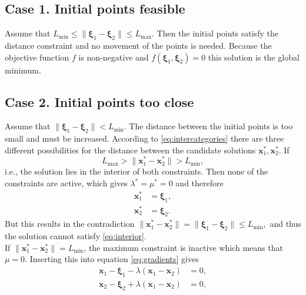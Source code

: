 \subsection{Case 1. Initial points feasible}
%
Assume that $ L_{\min} \leq \| \boldsymbol{\xi}_1 - \boldsymbol{\xi}_2 \| \leq L_{\max} $.
Then the initial points satisfy the distance constraint and no movement of the points is needed. 
Because the objective function $f$ is non-negative
and $f(\boldsymbol{\xi}_1,\boldsymbol{\xi}_2) = 0$ this solution is the global minimum.
%
%
\subsection{Case 2. Initial points too close}
%
Assume that $ \| \boldsymbol{\xi}_1 - \boldsymbol{\xi}_2 \| < L_{\min} $.
The distance between the initial points is too small and must be increased.
%
According to \eqref{eq:intercategories} there are three different possibilities 
for the distance between the candidate solutions $\textbf{x}_1^*, \textbf{x}_2^*$. 
%
If 
\begin{equation}
L_{\max} >  \| \textbf{x}_1^* - \textbf{x}_2^*  \| > L_{\min},
\label{eq:interior}
\end{equation}
i.e., the solution lies in the interior of both constraints. 
Then none of the constraints are active, which gives
$\lambda^* =\mu^* = 0 $ and therefore
%
\begin{equation}
\begin{aligned}
    	\textbf{x}_1^* &= \boldsymbol{\xi}_1,\\
    	\textbf{x}_2^* &= \boldsymbol{\xi}_2.
\end{aligned}
\end{equation}
%
But this results in the contradiction 
$\| \textbf{x}_1^* - \textbf{x}_2^*  \| = \| \boldsymbol{\xi}_1 - \boldsymbol{\xi}_2 \| \leq L_{\min},$ 
and thus the solution cannot satisfy \eqref{eq:interior}.\\
%
%
If $\| \textbf{x}_1^* - \textbf{x}_2^*  \| = L_{\min}$, the maximum
constraint is inactive which means that $\mu = 0$. Inserting this into 
equation \eqref{eq:gradients} gives
%
\begin{equation}
\begin{aligned}
\textbf{x}_1 - \boldsymbol{\xi}_1 - \lambda ( \textbf{x}_1 - \textbf{x}_2 )  &= 0, \\
\textbf{x}_2 - \boldsymbol{\xi}_2 + \lambda ( \textbf{x}_1 - \textbf{x}_2 )  &= 0,
\end{aligned}
\label{eq:gradients_2.1}
\end{equation}
